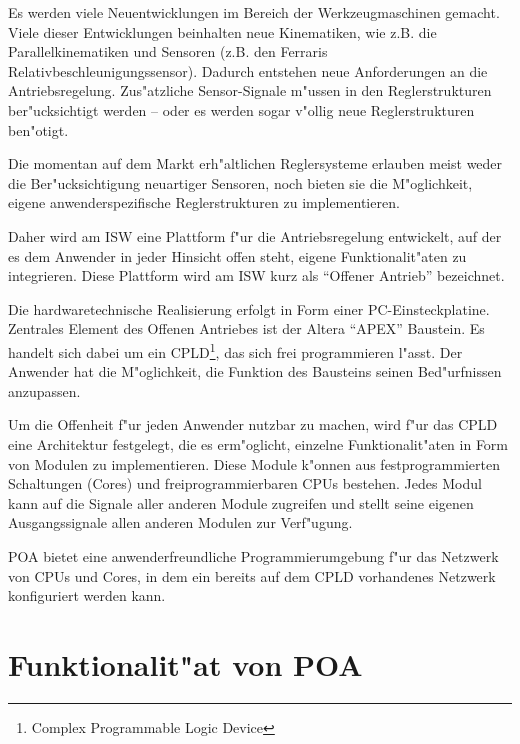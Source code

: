 \documentclass[a4paper,titlepage,12pt,ngerman]{scrbook}
\begin{document}
Es werden viele Neuentwicklungen im Bereich der Werkzeugmaschinen gemacht.
Viele dieser Entwicklungen beinhalten neue Kinematiken, wie z.B. die
Parallelkinematiken und Sensoren (z.B. den Ferraris 
Relativbeschleunigungssensor).
Dadurch entstehen neue Anforderungen an die Antriebsregelung. Zus"atzliche
Sensor-Signale m"ussen in den Reglerstrukturen ber"ucksichtigt werden -- oder
es werden sogar v"ollig neue Reglerstrukturen ben"otigt.\par
Die momentan auf dem Markt erh"altlichen Reglersysteme erlauben meist
weder die Ber"ucksichtigung neuartiger Sensoren, noch bieten sie die
M"oglichkeit, eigene anwenderspezifische Reglerstrukturen zu implementieren.\par
Daher wird am ISW eine Plattform f"ur die Antriebsregelung entwickelt,
auf der es dem Anwender in jeder Hinsicht offen steht, eigene Funktionalit"aten
zu integrieren. Diese Plattform wird am ISW kurz als ``Offener Antrieb''
bezeichnet.  \par
Die hardwaretechnische Realisierung erfolgt in Form einer PC-Einsteckplatine.
Zentrales Element des Offenen Antriebes ist der Altera ``APEX'' Baustein. Es
handelt sich dabei um ein CPLD\footnote{Complex Programmable Logic Device},
das sich frei programmieren l"asst. Der Anwender hat die M"oglichkeit, die
Funktion des Bausteins seinen Bed"urfnissen anzupassen.\par
Um die Offenheit f"ur jeden Anwender nutzbar zu machen, wird f"ur das CPLD eine
Architektur festgelegt, die es erm"oglicht, einzelne Funktionalit"aten in Form
von Modulen zu implementieren. Diese Module k"onnen aus festprogrammierten
Schaltungen (Cores) und freiprogrammierbaren CPUs bestehen. Jedes Modul kann
auf die Signale aller anderen Module zugreifen und stellt seine eigenen
Ausgangssignale allen anderen Modulen zur Verf"ugung.\par
POA bietet eine anwenderfreundliche Programmierumgebung f"ur das Netzwerk
von CPUs und Cores, in dem ein bereits auf dem CPLD vorhandenes
Netzwerk konfiguriert werden kann.




\chapter{Funktionalit"at von POA}
\end{document}
